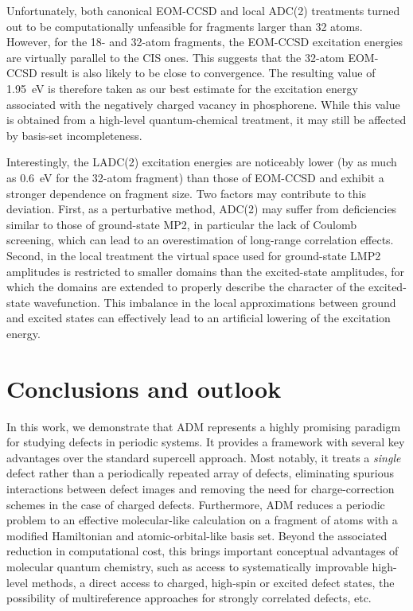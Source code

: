 \documentclass[aip,jcp,reprint]{revtex4-2}
\begin{document}
Unfortunately, both canonical EOM-CCSD and local ADC(2) treatments turned out to be computationally unfeasible for fragments larger than 32 atoms. However, for the 18- and 32-atom fragments, the EOM-CCSD excitation energies are virtually parallel to the CIS ones. This suggests that the 32-atom EOM-CCSD result is also likely to be close to convergence. The resulting value of 1.95~eV is therefore taken as our best estimate for the excitation energy associated with the negatively charged vacancy in phosphorene. While this value is obtained from a high-level quantum-chemical treatment, it may still be affected by basis-set incompleteness.

Interestingly, the LADC(2) excitation energies are noticeably lower (by as much as 0.6~eV for the 32-atom fragment) than those of EOM-CCSD and exhibit a stronger dependence on fragment size. Two factors may contribute to this deviation. First, as a perturbative method, ADC(2) may suffer from deficiencies similar to those of ground-state MP2, in particular the lack of Coulomb screening, which can lead to an overestimation of long-range correlation effects. Second, in the local treatment the virtual space used for ground-state LMP2 amplitudes is restricted to smaller domains than the excited-state amplitudes, for which the domains are extended to properly describe the character of the excited-state wavefunction. This imbalance in the local approximations between ground and excited states can effectively lead to an artificial lowering of the excitation energy.


\section{Conclusions and outlook}

In this work, we demonstrate that ADM represents a highly promising paradigm for studying defects in periodic systems. It provides a framework with several key advantages over the standard supercell approach. Most notably, it treats a {\it single} defect rather than a periodically repeated array of defects, eliminating spurious interactions between defect images and removing the need for charge-correction schemes in the case of charged defects. Furthermore, ADM reduces a periodic problem to an effective molecular-like calculation on a fragment of atoms with a modified Hamiltonian and atomic-orbital-like basis set. Beyond the associated reduction in computational cost, this brings important conceptual advantages of molecular quantum chemistry, such as access to systematically improvable high-level methods, a direct access to charged, high-spin or excited defect states, the possibility of multireference approaches for strongly correlated defects, etc.
\end{document}
